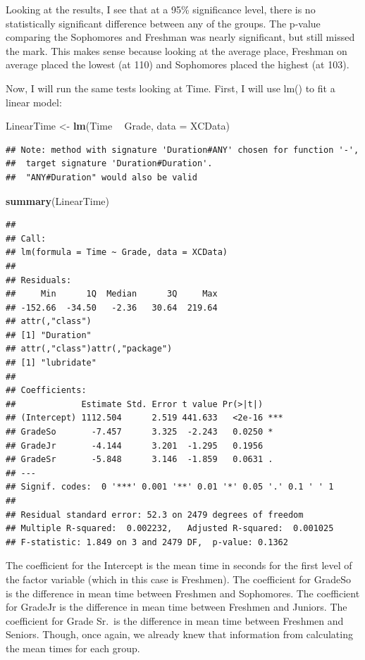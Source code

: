 \documentclass[
]{article}
\newenvironment{Shaded}{\begin{snugshade}}{\end{snugshade}}
\newcommand{\DataTypeTok}[1]{\textcolor[rgb]{0.13,0.29,0.53}{#1}}
\newcommand{\KeywordTok}[1]{\textcolor[rgb]{0.13,0.29,0.53}{\textbf{#1}}}
\newcommand{\NormalTok}[1]{#1}
\newcommand{\OperatorTok}[1]{\textcolor[rgb]{0.81,0.36,0.00}{\textbf{#1}}}
\newcommand{\StringTok}[1]{\textcolor[rgb]{0.31,0.60,0.02}{#1}}
\begin{document}
Looking at the results, I see that at a 95\% significance level, there
is no statistically significant difference between any of the groups.
The p-value comparing the Sophomores and Freshman was nearly
significant, but still missed the mark. This makes sense because looking
at the average place, Freshman on average placed the lowest (at 110) and
Sophomores placed the highest (at 103).

Now, I will run the same tests looking at Time. First, I will use lm()
to fit a linear model:

\begin{Shaded}
\begin{Highlighting}[]
\NormalTok{LinearTime <-}\StringTok{ }\KeywordTok{lm}\NormalTok{(Time }\OperatorTok{~}\StringTok{ }\NormalTok{Grade, }\DataTypeTok{data =}\NormalTok{ XCData)}
\end{Highlighting}
\end{Shaded}

\begin{verbatim}
## Note: method with signature 'Duration#ANY' chosen for function '-',
##  target signature 'Duration#Duration'.
##  "ANY#Duration" would also be valid
\end{verbatim}

\begin{Shaded}
\begin{Highlighting}[]
\KeywordTok{summary}\NormalTok{(LinearTime)}
\end{Highlighting}
\end{Shaded}

\begin{verbatim}
## 
## Call:
## lm(formula = Time ~ Grade, data = XCData)
## 
## Residuals:
##     Min      1Q  Median      3Q     Max 
## -152.66  -34.50   -2.36   30.64  219.64 
## attr(,"class")
## [1] "Duration"
## attr(,"class")attr(,"package")
## [1] "lubridate"
## 
## Coefficients:
##             Estimate Std. Error t value Pr(>|t|)    
## (Intercept) 1112.504      2.519 441.633   <2e-16 ***
## GradeSo       -7.457      3.325  -2.243   0.0250 *  
## GradeJr       -4.144      3.201  -1.295   0.1956    
## GradeSr       -5.848      3.146  -1.859   0.0631 .  
## ---
## Signif. codes:  0 '***' 0.001 '**' 0.01 '*' 0.05 '.' 0.1 ' ' 1
## 
## Residual standard error: 52.3 on 2479 degrees of freedom
## Multiple R-squared:  0.002232,   Adjusted R-squared:  0.001025 
## F-statistic: 1.849 on 3 and 2479 DF,  p-value: 0.1362
\end{verbatim}

The coefficient for the Intercept is the mean time in seconds for the
first level of the factor variable (which in this case is Freshmen). The
coefficient for GradeSo is the difference in mean time between Freshmen
and Sophomores. The coefficient for GradeJr is the difference in mean
time between Freshmen and Juniors. The coefficient for Grade Sr.~is the
difference in mean time between Freshmen and Seniors. Though, once
again, we already knew that information from calculating the mean times
for each group.
\end{document}
